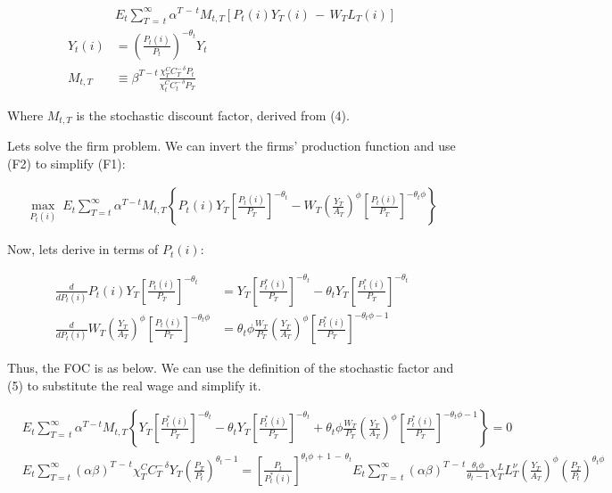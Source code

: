 \documentclass[12pt]{article}
\begin{document}
\begin{align*}
    &E_{t}\sum_{T\,=\,t}^{\infty}\alpha^{T\,-\,t}M_{t,T}[P_{t}(i)Y_{T}(i)\,-\,W_{T}L_{T}(i)] \tag{F1}\\
    Y_{t}(i) &= \left(\frac{P_{t}(i)}{P_{t}}\right)^{-\theta_{t}}Y_{t} \tag{F2}\\
    M_{t,T} &\equiv \beta^{T-t}\frac{\chi_{T}^{C}C_{T}^{-\,\delta}P_{t}}{\chi_{t}^{C}C_{t}^{-\,\delta}P_{T}}
\end{align*}

Where $M_{t,T}$ is the stochastic discount factor, derived from (4).

Lets solve the firm problem. We can invert the firms' production function and use (F2) to simplify (F1):

\begin{align*}
    \max_{P_{t}(i)}\ E_{t}\sum_{T=t}^{\infty}\alpha^{T-t}M_{t,T}\left\{P_{t}(i)Y_{T}\left[{\frac{P_{t}(i)}{P_{T}}}\right]^{-\theta_{t}}-W_{T}\left({\frac{Y_{T}}{A_{T}}}\right)^{\phi}\left[{\frac{P_{t}(i)}{P_{T}}}\right]^{-\theta_{t}\phi}\right\}
\end{align*}

Now, lets derive in terms of $P_t(i)$:

\begin{align*}
    \frac{d}{dP_t(i)} P_{t}(i)Y_{T}\left[{\frac{P_{t}(i)}{P_{T}}}\right]^{-\theta_{t}} &= Y_{T}\left[\frac{P_{t}^{*}(i)}{P_{T}}\right]^{-\theta_{t}}-\theta_{t}Y_{T}\left[\frac{P_{t}^{*}(i)}{P_{T}}\right]^{-\theta_{t}}\\
    \frac{d}{dP_t(i)} W_{T}\left({\frac{Y_{T}}{A_{T}}}\right)^{\phi}\left[{\frac{P_{t}(i)}{P_{T}}}\right]^{-\theta_{t}\phi} &= \theta_{t}\phi\frac{W_{T}}{P_{T}}\left(\frac{Y_{T}}{A_{T}}\right)^{\phi}\left[\frac{P_{t}^{*}(i)}{P_{T}}\right]^{-\theta_{t}\phi-1}
\end{align*}

Thus, the FOC is as below. We can use the definition of the stochastic factor and (5) to substitute the real wage and simplify it.

\begin{align*}
    &E_{t}\sum_{T=\,t}^{\infty}\alpha^{T-t}M_{t,T}\left\{Y_{T}\left[\frac{P_{t}^{*}(i)}{P_{T}}\right]^{-\theta_{t}}-\theta_{t}Y_{T}\left[\frac{P_{t}^{*}(i)}{P_{T}}\right]^{-\theta_{t}}+\theta_{t}\phi\frac{W_{T}}{P_{T}}\left(\frac{Y_{T}}{A_{T}}\right)^{\phi}\left[\frac{P_{t}^{*}(i)}{P_{T}}\right]^{-\theta_{t}\phi-1}\right\}=0\\
    &E_{t}\sum_{T=t}^{\infty}(\alpha\beta)^{T\,-\,t}\chi_{T}^{C}C_{T}^{-\,\delta}Y_{T}\left(\frac{P_{T}}{P_{t}}\right)^{\theta_{t}-1} = \left[\frac{P_{t}}{P_{t}^{*}(i)}\right]^{\theta_{t}\phi\,+\,1\,-\,\theta_{t}}E_{t}\sum_{T\,=\,t}^{\infty}(\alpha\beta)^{T\,-\,t}\frac{\theta_{t}\phi}{\theta_{t}-1}\chi_{T}^{L}L_{T}^{\nu}\left(\frac{Y_{T}}{A_{T}}\right)^{\phi}\left(\frac{P_{T}}{P_{t}}\right)^{\theta_{t}\phi}
\end{align*}
\end{document}

